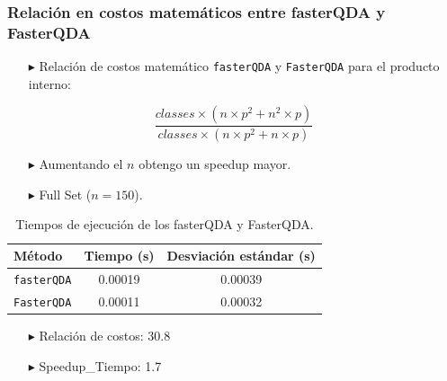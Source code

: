 \begin{frame}[fragile]
    \frametitle{Relación en costos matemáticos entre fasterQDA y FasterQDA}
  \begin{itemize}
    \item[$\blacktriangleright$] Relación de costos matemático \texttt{fasterQDA} y \texttt{FasterQDA} para el producto interno:
  \end{itemize}
  
  \[
    \frac{classes \times (n \times p^2 + n^2 \times p)}{classes \times (n \times p^2 + n \times p)}
  \]

  \begin{itemize}
    \item[$\blacktriangleright$] Aumentando el $n$ obtengo un speedup mayor.

    \item[$\blacktriangleright$] Full Set ($n=150$).
  \end{itemize}

  \begin{table}[h!]
      \centering
      \begin{tabular}{@{}lcc@{}}
        \toprule
        \textbf{Método}      & Tiempo (s)           & Desviación estándar (s) \\ 
        \midrule
        \texttt{fasterQDA}   & 0.00019              & 0.00039                 \\ 
        \texttt{FasterQDA}   & 0.00011              & 0.00032                 \\ 
        \bottomrule
      \end{tabular}
      \caption{Tiempos de ejecución de los fasterQDA y FasterQDA.}
  \end{table}
  \begin{itemize}
    \item[$\blacktriangleright$] Relación de costos: 30.8
    \item[$\blacktriangleright$] Speedup\_Tiempo: 1.7
  \end{itemize}

\end{frame}

